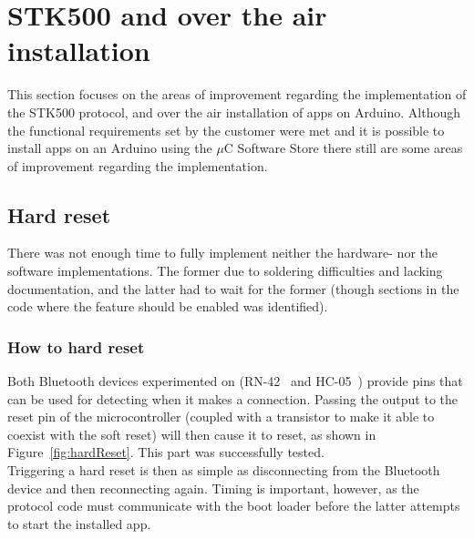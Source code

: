 \section{STK500 and over the air installation}
This section focuses on the areas of improvement regarding the implementation of the STK500 protocol, and over the air installation of apps on Arduino. Although the functional requirements set by the customer were met and it is possible to  install apps on an Arduino using the $\mu$C Software Store there still are some areas of improvement regarding the implementation.

	\subsection{Hard reset}
	There was not enough time to fully implement neither the hardware- nor the software implementations. The former
    due to soldering difficulties and lacking documentation, and the latter had to wait for the former (though
    sections in the code where the feature should be enabled was identified).

	   \subsubsection{How to hard reset}
    	Both Bluetooth devices experimented on (RN-42~\cite{rn-42} and HC-05~\cite{hc-05}) provide pins that can be used for detecting
        when it makes a connection. Passing the output to the reset pin of the microcontroller (coupled with a
        transistor to make it able to coexist with the soft reset) will then cause it to reset, as shown in Figure~\ref{fig:hardReset}. This part was
        successfully tested.\\

        Triggering a hard reset is then as simple as disconnecting from the Bluetooth device and then reconnecting
        again. Timing is important, however, as the protocol code must communicate with the boot loader before
        the latter attempts to start the installed app.

